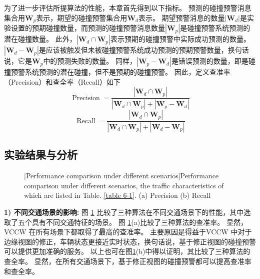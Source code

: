 为了进一步评估所提算法的性能，本章首先得到以下指标。
预测的碰撞预警消息集合用$\mathbf{W}_{p}$表示，期望的碰撞预警集合用$\mathbf{W}_{d}$表示。
期望预警消息的数量$\left| \mathbf{W}_{d} \right|$是实验设置的预期碰撞数量，而预测的碰撞预警消息数量$\left| \mathbf{W}_{p} \right|$是碰撞预警系统预测的潜在碰撞数量。
此外，$\left| \mathbf{W}_{d} \cap \mathbf{W}_{p} \right|$表示预期的碰撞预警中实际成功预测的数量。
$\left| \mathbf{W}_{d} - \mathbf{W}_{p} \right|$是应该被触发但未被碰撞预警系统成功预测的预期预警数量，换句话说，它是$\mathbf{W}_{p}$中的预测失败的数量。
同样，$\left| {\mathbf{W}_{p} - \mathbf{W}_{d}} \right|$是错误预测的数量，即是碰撞预警系统预测的潜在碰撞，但不是预期的碰撞预警。
因此，定义查准率（Precision）和查全率（Recall）如下
\begin{equation}
	\operatorname{Precision} = \frac{{\left| {\mathbf{W}_{d} \cap \mathbf{W}_{p}} \right|}}{{\left| {\mathbf{W}_{d} \cap \mathbf{W}_{p}} \right| + \left| {\mathbf{W}_{p} - \mathbf{W}_{d}} \right|}}
\end{equation}
\begin{equation}
	\operatorname{Recall} = \frac{{\left| {\mathbf{W}_{d} \cap \mathbf{W}_{p}} \right|}}{{\left| {\mathbf{W}_{d} \cap \mathbf{W}_{p}} \right| + \left| {\mathbf{W}_{d} - \mathbf{W}_{p}} \right|}}
\end{equation}

\subsection{实验结果与分析}

\begin{figure}[h]
     \centering
     [Performance comparison under different scenarios]{Performance comparison under different scenarios, the traffic characteristics of which are listed in Table. \ref{table 6-1}. (a) Precision (b) Recall}
     \label{fig 5-5}
\end{figure}

\textbf{1) 不同交通场景的影响:}
图 \ref{fig 5-5} 比较了三种算法在不同交通场景下的性能，其中选取了五个具有不同交通特征的场景。
图 \ref{fig 5-5}(a)比较了三种算法的查准率。
显然，VCCW 在所有场景下都取得了最高的查准率。
主要原因是得益于VCCW 中对于边缘视图的修正，车辆状态更接近实时状态，换句话说，基于修正视图的碰撞预警可以提供更加准确的服务。
以上也可在图\ref{fig 5-5}(b)中得以证明，其比较了三种算法的查全率。
显然，在所有交通场景下，基于修正视图的碰撞预警都可以提高查准率和查全率。

